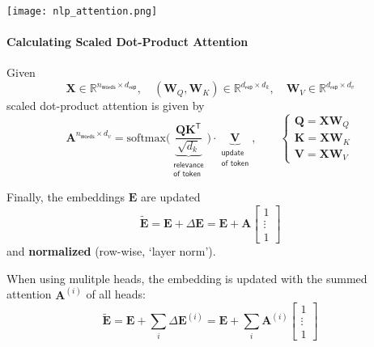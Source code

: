 \newpar{}
\begin{center}
    \texttt{[image: nlp\_attention.png]}
\end{center}

\paragraph{Calculating Scaled Dot-Product Attention}

Given
\noindent\begin{equation*}
    \mathbf{X}\in \mathbb{R}^{n_{\mathsf{words}} \times d_{\mathsf{rep}}},\quad (\mathbf{W}_Q, \mathbf{W}_K)\in \mathbb{R}^{d_{\mathsf{rep}}\times d_k},\quad \mathbf{W}_V\in \mathbb{R}^{d_{\mathsf{rep}}\times d_v}
\end{equation*}
scaled dot-product attention is given by
\noindent\begin{equation*}
    \mathbf{A}^{n_{\mathsf{words}}\times d_v} = \mathrm{softmax}\Biggl(\underbrace{\frac{\mathbf{QK}^{\mathsf{T}}}{\sqrt{d_k}}}_{\substack{\textsf{relevance} \\ \textsf{of token}}}\Biggr)\cdot \underbrace{\mathbf{V}}_{\substack{\textsf{update} \\ \textsf{of token}}},\qquad
    \begin{cases}
        \mathbf{Q} = \mathbf{XW}_Q \\
        \mathbf{K} = \mathbf{XW}_K \\
        \mathbf{V} = \mathbf{XW}_V
    \end{cases}
\end{equation*}

Finally, the embeddings $\mathbf{E}$ are updated
\noindent\begin{equation*}
    \tilde{\mathbf{E}} = \mathbf{E} + \Delta \mathbf{E} = \mathbf{E} + \mathbf{A}\begin{bmatrix}
        1 \\ \vdots \\ 1
    \end{bmatrix}
\end{equation*}
and \textbf{normalized} (row-wise, `layer norm').

\newpar{}

When using mulitple heads, the embedding is updated with the summed attention $\mathbf{A}^{(i)}$ of all heads:
\noindent\begin{equation*}
    \tilde{\mathbf{E}} = \mathbf{E} + \sum_i \Delta \mathbf{E}^{(i)} = \mathbf{E} + \sum_{i} \mathbf{A}^{(i)}\begin{bmatrix}
        1 \\ \vdots \\ 1
    \end{bmatrix}
\end{equation*}

